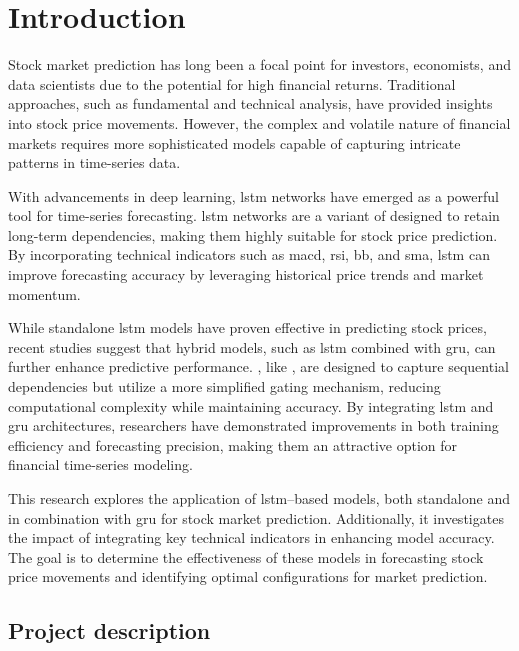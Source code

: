 \clearpage
{}
\pagestyle{plain}

\section{Introduction}

Stock market prediction has long been a focal point for investors, economists, and
data scientists due to the potential for high financial returns. Traditional
approaches, such as fundamental and technical analysis, have provided insights into
stock price movements. However, the complex and volatile nature of financial markets
requires more sophisticated models capable of capturing intricate patterns in 
time-series data.

With advancements in deep learning, \acrfull{lstm} networks have emerged as a 
powerful tool for time-series forecasting. \acrshort{lstm} networks are a variant 
of  designed to retain long-term dependencies, making them highly
suitable for stock price prediction. By incorporating technical indicators such as
\acrfull{macd}, \acrfull{rsi}, \acrfull{bb}, and \acrfull{sma}, \acrshort{lstm}
can improve forecasting accuracy by leveraging historical price trends and market
momentum.

While standalone \acrshort{lstm} models have proven effective in predicting stock
prices, recent studies suggest that hybrid models, such as \acrshort{lstm} combined
with \acrfull{gru}, can further enhance predictive performance. , like
, are designed to capture sequential dependencies but utilize a more
simplified gating mechanism, reducing computational complexity while maintaining
accuracy. By integrating \acrshort{lstm} and \acrshort{gru} architectures, researchers
have demonstrated improvements in both training efficiency and forecasting precision,
making them an attractive option for financial time-series modeling.

This research explores the application of \acrshort{lstm}--based models, both
standalone and in combination with \acrshort{gru} for stock market prediction.
Additionally, it investigates the impact of integrating key technical indicators in
enhancing model accuracy. The goal is to determine the effectiveness of these models
in forecasting stock price movements and identifying optimal configurations for 
market prediction.

\subsection{Project description}

